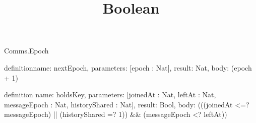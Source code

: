 \begin{lexlean}{Comms.Epoch}
\title{Boolean}
\begin{semanticmodule}
definition{name: nextEpoch, parameters: [epoch : Nat], result: Nat, body: (epoch + 1)}

definition{
  name: holdsKey,
  parameters: [joinedAt : Nat, leftAt : Nat, messageEpoch : Nat, historyShared : Nat],
  result: Bool,
  body: (((joinedAt <=? messageEpoch) || (historyShared =? 1)) && (messageEpoch <? leftAt))
}
\end{semanticmodule}
\end{lexlean}
